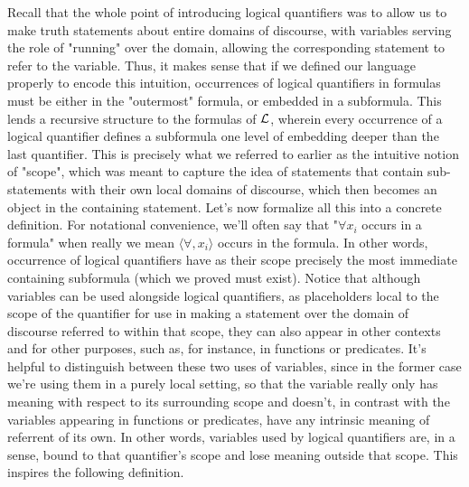 \documentclass{article}
\begin{document}
Recall that the whole point of introducing logical quantifiers was to allow us to make truth statements about entire domains of discourse, with variables serving the role of "running" over the domain, allowing the corresponding statement to refer to the variable. Thus, it makes sense that if we defined our language properly to encode this intuition, occurrences of logical quantifiers in formulas must be either in the "outermost" formula, or embedded in a subformula. This lends a recursive structure to the formulas of $ \mathcal{L} $, wherein every occurrence of a logical quantifier defines a subformula one level of embedding deeper than the last quantifier. This is precisely what we referred to earlier as the intuitive notion of "scope", which was meant to capture the idea of statements that contain sub-statements with their own local domains of discourse, which then becomes an object in the containing statement. Let's now formalize all this into a concrete definition. For notational convenience, we'll often say that "$ \forall x_i $ occurs in a formula" when really we mean $ \langle \forall, x_i \rangle $ occurs in the formula.
In other words, occurrence of logical quantifiers have as their scope precisely the most immediate containing subformula (which we proved must exist). Notice that although variables can be used alongside logical quantifiers, as placeholders local to the scope of the quantifier for use in making a statement over the domain of discourse referred to within that scope, they can also appear in other contexts and for other purposes, such as, for instance, in functions or predicates. It's helpful to distinguish between these two uses of variables, since in the former case we're using them in a purely local setting, so that the variable really only has meaning with respect to its surrounding scope and doesn't, in contrast with the variables appearing in functions or predicates, have any intrinsic meaning of referrent of its own. In other words, variables used by logical quantifiers are, in a sense, bound to that quantifier's scope and lose meaning outside that scope. This inspires the following definition.
\end{document}
